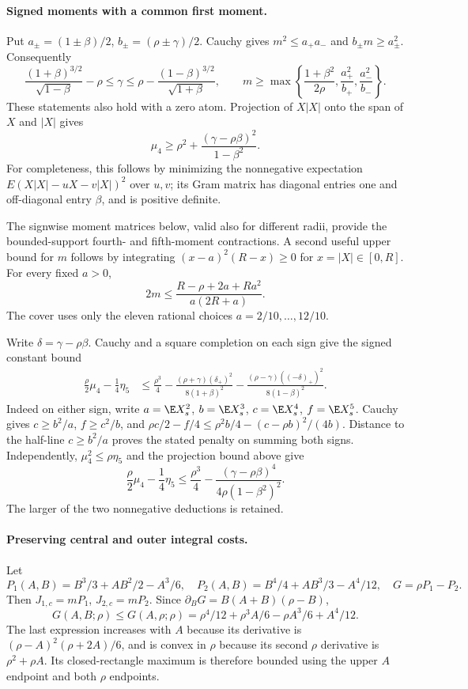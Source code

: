 \paragraph{Signed moments with a common first moment.}\label{j:local:atlas}\label{j:local:moments}
Put $a_\pm=(1\pm\beta)/2$, $b_\pm=(\rho\pm\gamma)/2$.
Cauchy gives $m^2\le a_+a_-$ and $b_\pm m\ge a_\pm^2$.
Consequently
\[
 \frac{(1+\beta)^{3/2}}{\sqrt{1-\beta}}-\rho
 \le\gamma\le
 \rho-\frac{(1-\beta)^{3/2}}{\sqrt{1+\beta}},\qquad
 m\ge\max\left\{\frac{1+\beta^2}{2\rho},
                  \frac{a_+^2}{b_+},\frac{a_-^2}{b_-}\right\}.
\]
These statements also hold with a zero atom. Projection of $X|X|$ onto
the span of $X$ and $|X|$ gives
\[
 \mu_4\ge\rho^2+\frac{(\gamma-\rho\beta)^2}{1-\beta^2}.
\]
For completeness, this follows by minimizing the nonnegative expectation
$E(X|X|-uX-v|X|)^2$ over $u,v$; its Gram matrix has diagonal entries
one and off-diagonal entry $\beta$, and is positive definite.

The signwise moment matrices below, valid also for different radii,
provide the bounded-support fourth- and fifth-moment contractions.
A second useful upper bound for $m$ follows by integrating
$(x-a)^2(R-x)\ge0$ for $x=|X|\in[0,R]$. For every fixed $a>0$,
\[
 2m\le\frac{R-\rho+2a+Ra^2}{a(2R+a)}.
\]
The cover uses only the eleven rational choices $a=2/10,\ldots,12/10$.

Write $\delta=\gamma-\rho\beta$. Cauchy and a square completion on
each sign give the signed constant bound
\begin{align*}
 \frac\rho2\mu_4-\frac14\eta_5
 &\le\frac{\rho^3}{4}
 -\frac{(\rho+\gamma)(\delta_+)^2}{8(1+\beta)^2}
 -\frac{(\rho-\gamma)((-\delta)_+)^2}{8(1-\beta)^2}.
\end{align*}
Indeed on either sign, write $a=\E X_s^2$, $b=\E X_s^3$,
$c=\E X_s^4$, $f=\E X_s^5$. Cauchy gives $c\ge b^2/a$,
$f\ge c^2/b$, and
$\rho c/2-f/4\le\rho^2b/4-(c-\rho b)^2/(4b)$.
Distance to the half-line $c\ge b^2/a$ proves the stated penalty
on summing both signs. Independently,
$\mu_4^2\le\rho\eta_5$ and the projection bound above give
\[
 \frac\rho2\mu_4-\frac14\eta_5
 \le\frac{\rho^3}{4}
 -\frac{(\gamma-\rho\beta)^4}{4\rho(1-\beta^2)^2}.
\]
The larger of the two nonnegative deductions is retained.


\paragraph{Preserving central and outer integral costs.}
Let
\[
 P_1(A,B)=B^3/3+AB^2/2-A^3/6,\quad
 P_2(A,B)=B^4/4+AB^3/3-A^4/12,\quad G=\rho P_1-P_2.
\]
Then $J_{1,c}=mP_1$, $J_{2,c}=mP_2$. Since
$\partial_BG=B(A+B)(\rho-B)$,
\[
 G(A,B;\rho)\le G(A,\rho;\rho)
 =\rho^4/12+\rho^3A/6-\rho A^3/6+A^4/12.
\]
The last expression increases with $A$ because its derivative is
$(\rho-A)^2(\rho+2A)/6$, and is convex in $\rho$ because its second
$\rho$ derivative is $\rho^2+\rho A$. Its closed-rectangle maximum is
therefore bounded using the upper $A$ endpoint and both $\rho$ endpoints.

